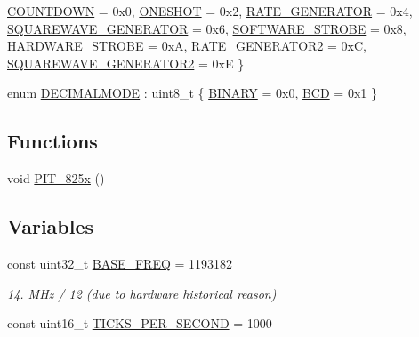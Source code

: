 \begin{DoxyCompactItemize}
\hyperlink{namespace_t_i_m_e_r_a3231391ecc5f5895452fcc54c5fabe26a06efb23533d3d7e51cd3326db82146e1}{C\+O\+U\+N\+T\+D\+O\+WN} = 0x0, 
\hyperlink{namespace_t_i_m_e_r_a3231391ecc5f5895452fcc54c5fabe26a5402554577b28ae2338dd6c9c0df375f}{O\+N\+E\+S\+H\+OT} = 0x2, 
\hyperlink{namespace_t_i_m_e_r_a3231391ecc5f5895452fcc54c5fabe26a97f3074fdfb64cf0447db4462d1ffb3d}{R\+A\+T\+E\+\_\+\+G\+E\+N\+E\+R\+A\+T\+OR} = 0x4, 
\hyperlink{namespace_t_i_m_e_r_a3231391ecc5f5895452fcc54c5fabe26a0ba7addb1833eb3dca07bab98dbe39b4}{S\+Q\+U\+A\+R\+E\+W\+A\+V\+E\+\_\+\+G\+E\+N\+E\+R\+A\+T\+OR} = 0x6, 
\newline
\hyperlink{namespace_t_i_m_e_r_a3231391ecc5f5895452fcc54c5fabe26a2c24c25d57016104dab42aa010f31ef8}{S\+O\+F\+T\+W\+A\+R\+E\+\_\+\+S\+T\+R\+O\+BE} = 0x8, 
\hyperlink{namespace_t_i_m_e_r_a3231391ecc5f5895452fcc54c5fabe26a38141ffb893bfea01739585eb563945c}{H\+A\+R\+D\+W\+A\+R\+E\+\_\+\+S\+T\+R\+O\+BE} = 0xA, 
\hyperlink{namespace_t_i_m_e_r_a3231391ecc5f5895452fcc54c5fabe26a223f042f6282d268b1e7e6edc8533597}{R\+A\+T\+E\+\_\+\+G\+E\+N\+E\+R\+A\+T\+O\+R2} = 0xC, 
\hyperlink{namespace_t_i_m_e_r_a3231391ecc5f5895452fcc54c5fabe26aecafb2f20488e9be37636c247f073181}{S\+Q\+U\+A\+R\+E\+W\+A\+V\+E\+\_\+\+G\+E\+N\+E\+R\+A\+T\+O\+R2} = 0xE
 \}
\item 
enum \hyperlink{namespace_t_i_m_e_r_aa762d05daed3ea97420e855a5d03253d}{D\+E\+C\+I\+M\+A\+L\+M\+O\+DE} \+: uint8\+\_\+t \{ \hyperlink{namespace_t_i_m_e_r_aa762d05daed3ea97420e855a5d03253da99f5fa2a10e384e9980cc7b9d2053094}{B\+I\+N\+A\+RY} = 0x0, 
\hyperlink{namespace_t_i_m_e_r_aa762d05daed3ea97420e855a5d03253dac8b1953c3a3129fb92120b332014a43a}{B\+CD} = 0x1
 \}
\end{DoxyCompactItemize}
\subsection*{Functions}
\begin{DoxyCompactItemize}
\item 
void \hyperlink{namespace_t_i_m_e_r_a9914c0026a4661367482a01e7834500e}{P\+I\+T\+\_\+825x} ()
\end{DoxyCompactItemize}
\subsection*{Variables}
\begin{DoxyCompactItemize}
\item 
const uint32\+\_\+t \hyperlink{namespace_t_i_m_e_r_a5e00501463f93ce13bbbc8b9798cdc2c}{B\+A\+S\+E\+\_\+\+F\+R\+EQ} = 1\textquotesingle{}193\textquotesingle{}182
\begin{DoxyCompactList}\small\item\em 14. M\+Hz / 12 (due to hardware historical reason) \end{DoxyCompactList}\item 
const uint16\+\_\+t \hyperlink{namespace_t_i_m_e_r_aae36b4824645d9f2f506cd1199817117}{T\+I\+C\+K\+S\+\_\+\+P\+E\+R\+\_\+\+S\+E\+C\+O\+ND} = 1\textquotesingle{}000
\end{DoxyCompactItemize}


